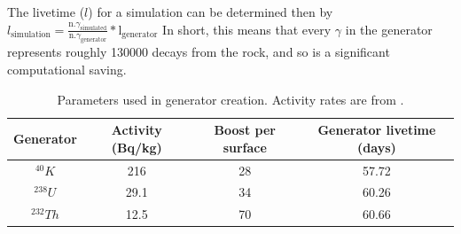 \par
The livetime ($l$) for a simulation can be determined then by $l_{\text{simulation}} = \frac{\text{n.} \gamma_{\text{simulated}}}{\text{n.} \gamma_{\text{generator}}} * \text{l}_{\text{generator}}$
In short, this means that every $\gamma$ in the generator represents roughly 130000 decays from the rock, and so is a significant computational saving.


\begin{table}[!htbp]
    \centering
    \begin{tabular}{c|c|c|c}
        Generator    & Activity (Bq/kg) & Boost per surface & Generator livetime (days)  \\ \hline
        ${}^{40}K$   & 216              & 28                & 57.72                      \\
        ${}^{238}U$  & 29.1             & 34                & 60.26                      \\
        ${}^{232}Th$ & 12.5             & 70                & 60.66
    \end{tabular}
    \caption{Parameters used in generator creation. Activity rates are from \cite{LZ_Gamma_Ray_Background_ref}.}
    \label{tab:cavern_gamma_generator_parameters}
\end{table}


